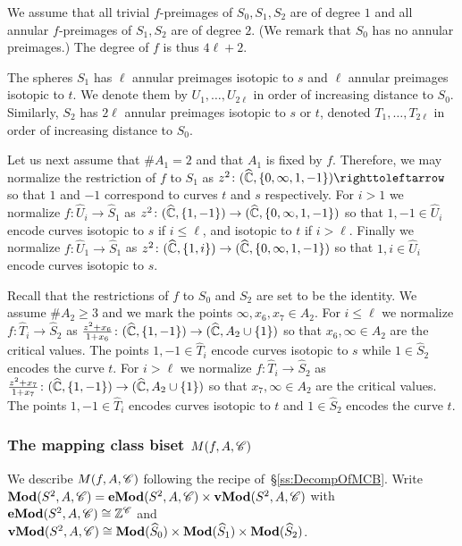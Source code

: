 \documentclass{amsart}
\begin{document}
We assume that all trivial $f$-preimages of $S_0,S_1,S_2$ are of
degree $1$ and all annular $f$-preimages of $S_1,S_2$ are of degree
$2$. (We remark that $S_0$ has no annular preimages.) The degree of
$f$ is thus $4\ell+2$.

The spheres $S_1$ has $\ell$ annular preimages isotopic to $s$ and
$\ell$ annular preimages isotopic to $t$. We denote them by
$U_1,\dots,U_{2\ell}$ in order of increasing distance to
$S_0$. Similarly, $S_2$ has $2\ell$ annular preimages isotopic to $s$
or $t$, denoted $T_1,\dots,T_{2\ell}$ in order of increasing distance
to $S_0$.

Let us next assume that $\#A_1=2$ and that $A_1$ is fixed by
$f$. Therefore, we may normalize the restriction of $f$ to $S_1$ as
$z^2\colon (\hC, \{0,\infty,1,-1\})\selfmap$ so that $1$ and $-1$
correspond to curves $t$ and $s$ respectively. For $i>1$ we normalize
$f\colon \widehat U_i\to \widehat S_1$ as
$z^2\colon (\hC, \{1,-1\})\to (\hC, \{0,\infty,1,-1\})$ so that
$1,-1\in \widehat U_i$ encode curves isotopic to $s$ if $i\le \ell$,
and isotopic to $t$ if $i>\ell$. Finally we normalize
$f\colon \widehat U_1\to \widehat S_1$ as
$z^2\colon (\hC, \{1,i\})\to (\hC, \{0,\infty,1,-1\})$ so that
$1,i\in \widehat U_i$ encode curves isotopic to $s$.

Recall that the restrictions of $f$ to $S_0$ and $S_2$ are set to be
the identity. We assume $\#A_2\ge 3$ and we mark the points
$\infty, x_6,x_7\in A_2$. For $i\le \ell$ we normalize
$f\colon \widehat T_i\to\widehat S_2$ as
$\frac{z^2+x_6}{1+x_6}\colon (\hC,\{1,-1\})\to (\hC,A_2\cup \{1\})$ so
that $x_6, \infty\in A_2$ are the critical values. The points
$1,-1\in \widehat T_i$ encode curves isotopic to $s$ while
$1\in \widehat S_2$ encodes the curve $t$. For $i> \ell$ we normalize
$f\colon\widehat T_i\to \widehat S_2$ as
$\frac{z^2+x_7}{1+x_7}\colon (\hC,\{1,-1\})\to (\hC,A_2\cup \{1\})$ so
that $x_7, \infty\in A_2$ are the critical values. The points
$1,-1\in \widehat T_i$ encodes curves isotopic to $t$ and
$1\in \widehat S_2$ encodes the curve $t$.
 
\subsubsection{The mapping class biset $M(f,A,\CC)$}
We describe $M(f,A,\CC)$ following the recipe
of~\S\ref{ss:DecompOfMCB}.  Write
$\Mod(S^2,A,\CC)=\Mod[e](S^2,A,\CC)\times\Mod[v](S^2,A,\CC)$ with
$\Mod[e](S^2,A,\CC)\cong \Z^{\CC}$ and
$\Mod[v](S^2,A,\CC)\cong \Mod(\widehat S_0)\times \Mod(\widehat
S_1)\times\Mod(\widehat S_2)$.
\end{document}
